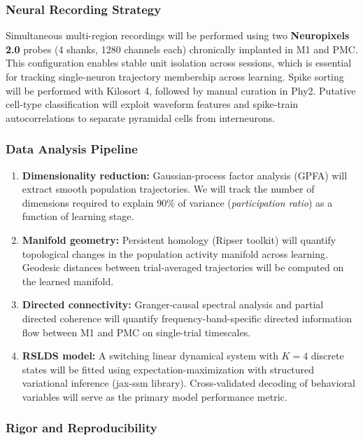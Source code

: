 \subsubsection{Neural Recording Strategy}

Simultaneous multi-region recordings will be performed using two \textbf{Neuropixels 2.0}
probes (4 shanks, 1280 channels each) chronically implanted in M1 and PMC. This configuration
enables stable unit isolation across sessions, which is essential for tracking single-neuron
trajectory membership across learning. Spike sorting will be performed with Kilosort 4,
followed by manual curation in Phy2. Putative cell-type classification will exploit waveform
features and spike-train autocorrelations to separate pyramidal cells from interneurons.

\subsubsection{Data Analysis Pipeline}

\begin{enumerate}[leftmargin=*, label=\textbf{Step \arabic*.}, itemsep=4pt]
  \item \textbf{Dimensionality reduction:} Gaussian-process factor analysis (GPFA) will
    extract smooth population trajectories. We will track the number of dimensions required to
    explain 90\% of variance (\textit{participation ratio}) as a function of learning stage.
  \item \textbf{Manifold geometry:} Persistent homology (Ripser toolkit) will quantify
    topological changes in the population activity manifold across learning. Geodesic distances
    between trial-averaged trajectories will be computed on the learned manifold.
  \item \textbf{Directed connectivity:} Granger-causal spectral analysis and partial directed
    coherence will quantify frequency-band-specific directed information flow between M1 and PMC
    on single-trial timescales.
  \item \textbf{RSLDS model:} A switching linear dynamical system with $K=4$ discrete states
    will be fitted using expectation-maximization with structured variational inference
    (jax-ssm library). Cross-validated decoding of behavioral variables will serve as the
    primary model performance metric.
\end{enumerate}

\subsubsection{Rigor and Reproducibility}

